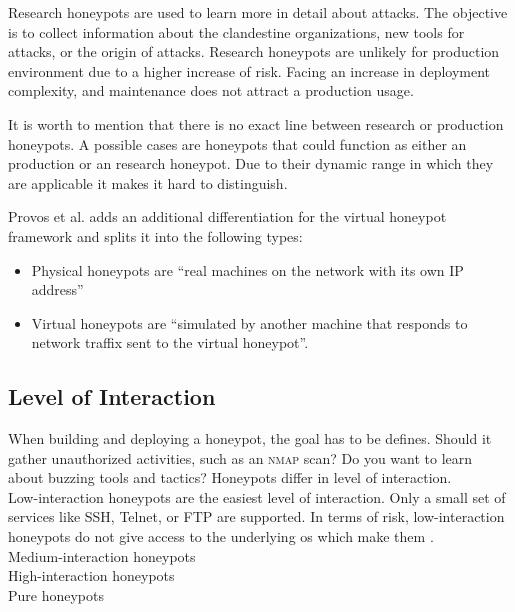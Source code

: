Research honeypots are used to learn more in detail about attacks. The objective is to collect information about the clandestine organizations, new tools for attacks, or the origin of attacks. Research honeypots are unlikely for production environment due to a higher increase of risk. Facing an increase in deployment complexity, and maintenance does not attract a production usage.

It is worth to mention that there is no exact line between research or production honeypots. A possible cases are honeypots that could function as either an production or an research honeypot. Due to their dynamic range in which they are applicable it makes it hard to distinguish. 

Provos et al. adds an additional differentiation for the virtual honeypot framework \cite{Provos2003} and splits it into the following types:

\begin{itemize}
    \item Physical honeypots are \enquote{real machines on the network with its own IP address}
    \item Virtual honeypots are \enquote{simulated by another machine that responds to network traffix sent to the virtual honeypot}.
\end{itemize}

\subsection{Level of Interaction}
\label{subsec:interaction-honeypots}

When building and deploying a honeypot, the goal has to be defines. Should it gather unauthorized activities, such as an \textsc{nmap} scan? Do you want to learn about buzzing tools and tactics? Honeypots differ in level of interaction.\\

Low-interaction honeypots are the easiest level of interaction. Only a small set of services like SSH, Telnet, or FTP are supported. In terms of risk, low-interaction honeypots do not give access to the underlying \ac{os} which make them . \\

Medium-interaction honeypots\\

High-interaction honeypots\\

Pure honeypots\\

